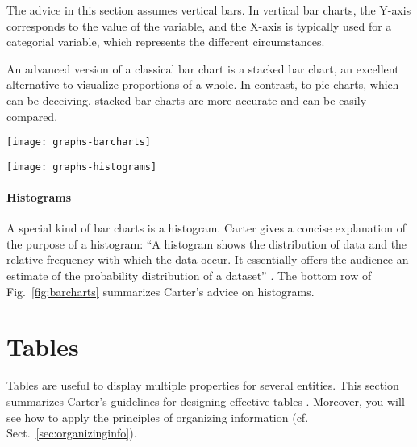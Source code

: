 The advice in this section assumes vertical bars. In vertical bar charts, the Y-axis corresponds to the value of the variable, and the X-axis is typically used for a categorial variable, which represents the different circumstances.

An advanced version of a classical bar chart is a stacked bar chart, an excellent alternative to visualize proportions of a whole. In contrast, to pie charts, which can be deceiving, stacked bar charts are more accurate and can be easily compared.

\begin{figure*}[t]
\centering
\vspace{4\baselineskip}
\texttt{[image: graphs-barcharts]}

\bigskip

\texttt{[image: graphs-histograms]}
\end{figure*}

\paragraph{Histograms} A special kind of bar charts is a histogram. Carter gives a concise explanation of the purpose of a histogram: ``A histogram shows the distribution of data and the relative frequency with which the data occur. It essentially offers the audience an estimate of the probability distribution of a dataset'' \cite{Carter12}. The bottom row of Fig.~\ref{fig:barcharts} summarizes Carter's advice on histograms.







\section{Tables}
\label{sec:tableguide}

Tables are useful to display multiple properties for several entities. This section summarizes Carter's guidelines for designing effective tables \cite{Carter12}. Moreover, you will see how to apply the principles of organizing information (cf. Sect.~\ref{sec:organizinginfo}).

